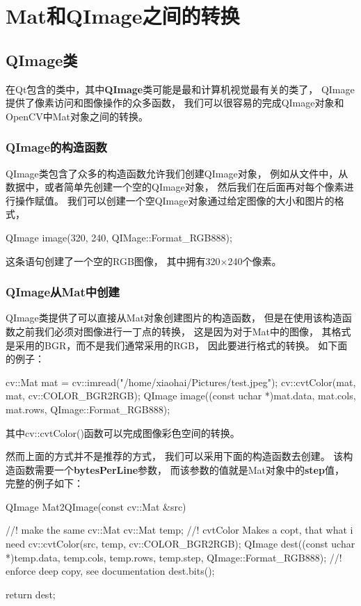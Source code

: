 \chapter{Mat和QImage之间的转换}
\section{QImage类}
在Qt包含的类中，其中\textbf{\color{magenta}QImage}类可能是最和计算机视觉最有关的类了，%
QImage提供了像素访问和图像操作的众多函数，%
我们可以很容易的完成QImage对象和OpenCV中Mat对象之间的转换。%

\subsection{QImage的构造函数}
QImage类包含了众多的构造函数允许我们创建QImage对象，%
例如从文件中，从数据中，或者简单先创建一个空的QImage对象，%
然后我们在后面再对每个像素进行操作赋值。%
我们可以创建一个空QImage对象通过给定图像的大小和图片的格式，%
\begin{cppcode}
  QImage image(320, 240, QIMage::Format_RGB888);
\end{cppcode}
这条语句创建了一个空的RGB图像，%
其中拥有320$\times$240个像素。

\subsection{QImage从Mat中创建}
QImage类提供了可以直接从Mat对象创建图片的构造函数，%
但是在使用该构造函数之前我们必须对图像进行一丁点的转换，%
这是因为对于Mat中的图像，%
其格式是采用的BGR，而不是我们通常采用的RGB，%
因此要进行格式的转换。%
如下面的例子：
\begin{cppcode}
  cv::Mat mat = cv::imread("/home/xiaohai/Pictures/test.jpeg");
  cv::cvtColor(mat, mat, cv::COLOR_BGR2RGB);
  QImage image((const uchar *)mat.data, mat.cols, mat.rows, QImage::Format_RGB888);
\end{cppcode}
其中cv::cvtColor()函数可以完成图像彩色空间的转换。

然而上面的方式并不是推荐的方式，%
我们可以采用下面的构造函数去创建。%
该构造函数需要一个\textbf{\color{magenta}bytesPerLine}参数，%
而该参数的值就是Mat对象中的\textbf{\color{magenta}step}值，%
完整的例子如下：
\begin{cppcode}
  QImage Mat2QImage(const cv::Mat &src)
  {
    //! make the same cv::Mat
    cv::Mat temp;
    //! cvtColor Makes a copt, that what i need
    cv::cvtColor(src, temp, cv::COLOR_BGR2RGB);
    QImage dest((const uchar *)temp.data, temp.cols, temp.rows, temp.step, QImage::Format_RGB888);
    //! enforce deep copy, see documentation
    dest.bits();

    return dest;
  }
\end{cppcode}


